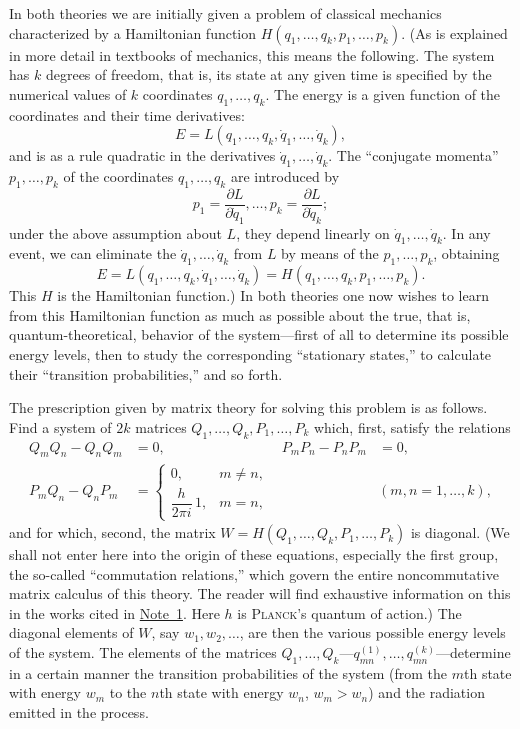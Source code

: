 \documentclass[fontsize=13pt,twoside,openany,headings=normal,parskip=false,bookmarkpackage=false,DIV=calc]{scrbook}
\begin{document}
In both theories we are initially given a problem of classical mechanics characterized by a Hamiltonian function $H(q_1,\ldots,q_k,p_1,\ldots,p_k)$. (As is explained in more detail in textbooks of mechanics, this means the following. The system has $k$ degrees of freedom, that is, its state at any given time is specified by the numerical values of $k$ coordinates $q_1,\ldots,q_k$. The energy is a given function of the coordinates and their time derivatives:
\[
 E=L(q_1,\ldots,q_k,\dot q_1,\ldots,\dot q_k),
\]
and is as a rule quadratic in the derivatives $\dot q_1,\ldots,\dot q_k$. The ``conjugate momenta'' $p_1,\ldots,p_k$ of the coordinates $q_1,\ldots,q_k$ are introduced by
\[
 p_1=\frac{\partial L}{\partial\dot q_1},\ldots,
 p_k=\frac{\partial L}{\partial\dot q_k};
\]
under the above assumption about $L$, they depend linearly on $\dot q_1,\ldots,\dot q_k$.
\hypertarget{origpage-6}{}%
In any event, we can eliminate the $\dot q_1,\ldots,\dot q_k$ from $L$ by means of the $p_1,\ldots,p_k$, obtaining
\[
 E=L(q_1,\ldots,q_k,\dot q_1,\ldots,\dot q_k)
  =H(q_1,\ldots,q_k,p_1,\ldots,p_k).
\]
This $H$ is the Hamiltonian function.) In both theories one now wishes to learn from this Hamiltonian function as much as possible about the true, that is, quantum-theoretical, behavior of the system---first of all to determine its possible energy levels, then to study the corresponding ``stationary states,'' to calculate their ``transition probabilities,'' and so forth.

The prescription given by matrix theory for solving this problem is as follows. Find a system of $2k$ matrices $Q_1,\ldots,Q_k,P_1,\ldots,P_k$ which, first, satisfy the relations
\leavevmode{}\label{rel:I.2.commutation}
\begin{align*}
 Q_mQ_n-Q_nQ_m&=0,& P_mP_n-P_nP_m&=0,\\
 P_mQ_n-Q_nP_m&=
 \begin{cases}0,&m\ne n,\\ \dfrac{h}{2\pi i}\,1,&m=n,\end{cases}
 &&(m,n=1,\ldots,k),
\end{align*}
and for which, second, the matrix $W=H(Q_1,\ldots,Q_k,P_1,\ldots,P_k)$ is diagonal. (We shall not enter here into the origin of these equations, especially the first group, the so-called ``commutation relations,'' which govern the entire noncommutative matrix calculus of this theory. The reader will find exhaustive information on this in the works cited in \hyperlink{note-1}{Note~1}. Here $h$ is \textsc{Planck}'s quantum of action.) The diagonal elements of $W$, say $w_1,w_2,\ldots$, are then the various possible energy levels of the system. The elements of the matrices $Q_1,\ldots,Q_k$---$q^{(1)}_{mn},\ldots,q^{(k)}_{mn}$---determine in a certain manner the transition probabilities of the system (from the $m$th state with energy $w_m$ to the $n$th state with energy $w_n$, $w_m>w_n$) and the radiation emitted in the process.
\end{document}
